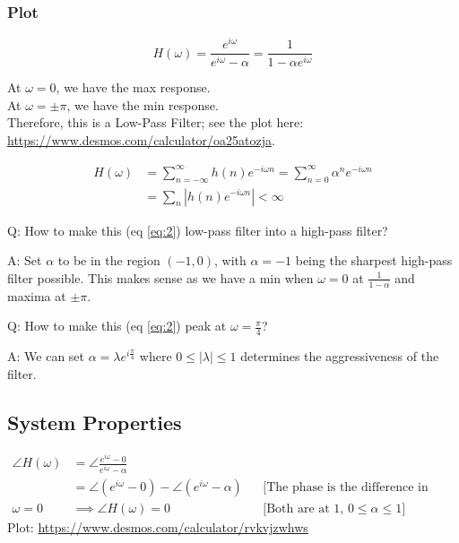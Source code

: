\subsubsection{Plot}
\begin{equation}\label{eq:2}
    H(\omega) 
    = \frac{e^{i\omega}}{e^{i\omega}-\alpha}
    = \frac1{1-\alpha e^{i\omega}}
\end{equation}

At $\omega = 0$, we have the max response.\\
At $\omega = \pm\pi$, we have the min response.\\
Therefore, this is a Low-Pass Filter; see the plot here:
\href{https://www.desmos.com/calculator/oa25atozja}{https://www.desmos.com/calculator/oa25atozja}.

\begin{align*}
    H(\omega) 
    &= \sum_{n=-\infty}^\infty h(n) e^{-i\omega n}
    = \sum_{n=0}^\infty \alpha^n e^{-i\omega n}
    \\
    &= \sum_n |h(n) e^{-i\omega n}| < \infty
\end{align*}

\begin{shaded}
Q: How to make this (eq \eqref{eq:2}) low-pass filter into a high-pass filter?

A: Set $\alpha$ to be in the region $(-1, 0)$, with $\alpha=-1$ being the sharpest high-pass filter possible. This makes sense as we have a min when $\omega=0$ at $\frac1{1-\alpha}$ and maxima at $\pm\pi$.
\end{shaded}

\begin{shaded}
Q: How to make this (eq \eqref{eq:2}) peak at $\omega=\frac\pi4$?

A: We can set $\alpha=\lambda e^{i\frac\pi4}$ where $0\le|\lambda|\le1$ determines the aggressiveness of the filter.
\end{shaded}

\subsection{System Properties}
\begin{align*}
    \angle H(\omega) 
    &= \angle \frac{e^{i\omega} - 0}{e^{i\omega}-\alpha}
    \\
    &= \angle{(e^{i\omega} - 0)} - \angle{(e^{i\omega}-\alpha)}
    &&\text{[The phase is the difference in phases of the 2 vectors]}
    \\
    \omega=0
    &\implies\angle H(\omega) = 0
    &&\text{[Both are at 1, }0\le\alpha\le1]
\end{align*}
Plot: \href{https://www.desmos.com/calculator/rvkvjzwhws}{https://www.desmos.com/calculator/rvkvjzwhws}

